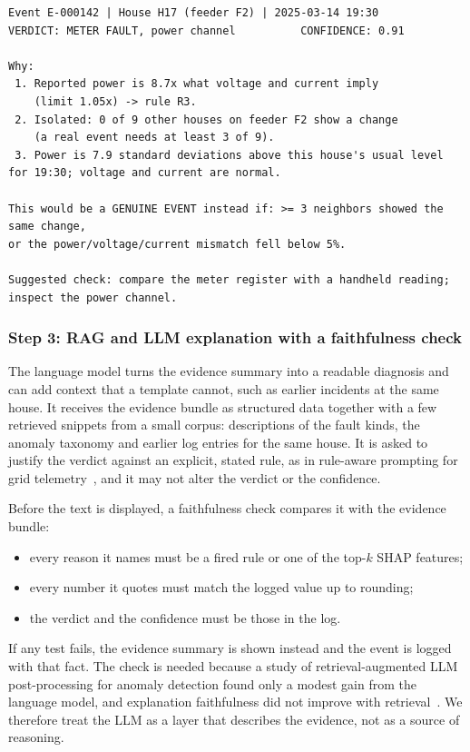 \documentclass[11pt,a4paper]{article}
\begin{document}
\begin{lstlisting}
Event E-000142 | House H17 (feeder F2) | 2025-03-14 19:30
VERDICT: METER FAULT, power channel          CONFIDENCE: 0.91

Why:
 1. Reported power is 8.7x what voltage and current imply
    (limit 1.05x) -> rule R3.
 2. Isolated: 0 of 9 other houses on feeder F2 show a change
    (a real event needs at least 3 of 9).
 3. Power is 7.9 standard deviations above this house's usual level for 19:30; voltage and current are normal.
 
This would be a GENUINE EVENT instead if: >= 3 neighbors showed the same change, 
or the power/voltage/current mismatch fell below 5%.

Suggested check: compare the meter register with a handheld reading; inspect the power channel.
\end{lstlisting}

\subsubsection*{Step 3: RAG and LLM explanation with a faithfulness check}
The language model turns the evidence summary into a readable diagnosis and can add context that a
template cannot, such as earlier incidents at the same house. It receives the evidence bundle as structured
data together with a few retrieved snippets from a small corpus: descriptions of the fault kinds, the
anomaly taxonomy and earlier log entries for the same house. It is asked to justify the verdict against an
explicit, stated rule, as in rule-aware prompting for grid telemetry~\cite{ruleaware}, and it may not alter
the verdict or the confidence.

Before the text is displayed, a faithfulness check compares it with the evidence bundle:
\begin{itemize}[leftmargin=*,itemsep=1pt]
  \item every reason it names must be a fired rule or one of the top-$k$ SHAP features;
  \item every number it quotes must match the logged value up to rounding;
  \item the verdict and the confidence must be those in the log.
\end{itemize}
If any test fails, the evidence summary is shown instead and the event is logged with that fact. The check
is needed because a study of retrieval-augmented LLM post-processing for anomaly detection found only a
modest gain from the language model, and explanation faithfulness did not improve with retrieval~\cite{ragaudit}.
We therefore treat the LLM as a layer that describes the evidence, not as a source of reasoning.
\end{document}
